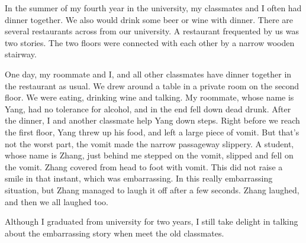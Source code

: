 \documentclass[12pt,a4paper]{caspset}
\begin{document}

In the summer of my fourth year in the university, my classmates and I often had dinner together. We also would drink some beer or wine with dinner. There are several restaurants across from our university. A restaurant frequented by us was two stories.  The two floors were connected with each other by a narrow wooden stairway. 

One day, my roommate and I, and all other classmates have dinner together in the restaurant as usual. We drew around a table in a private room on the second floor. We were eating, drinking wine and talking. My roommate, whose name is Yang, had no tolerance for alcohol, and in the end fell down dead drunk. After the dinner, I and another classmate help Yang down steps. Right before we reach the first floor, Yang threw up his food, and left a large piece of vomit. But that's not the worst part, the vomit made the narrow passageway slippery. A student, whose name is Zhang, just behind me stepped on the vomit,  slipped and fell on the vomit. Zhang covered from head to foot with vomit. This did not raise a smile in that instant, which was embarrassing. In this really embarrassing situation, but Zhang managed to laugh it off after a few seconds. Zhang laughed, and then we all laughed too.


Although I graduated from university for two years, I still take delight in talking about the embarrassing story when meet the old classmates.
\end{document}
